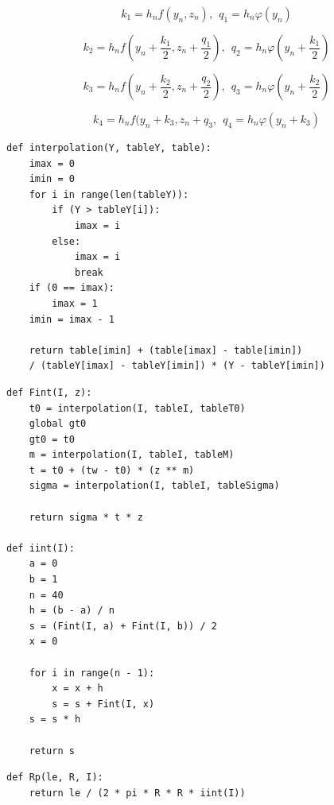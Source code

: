 \documentclass[a4paper,14pt]{extreport} %
\begin{document}
\begin{enumerate}
\begin{equation*}
    k_1 = h_n f(y_n, z_n), ~~q_1 = h_n \varphi (y_n)
\end{equation*}

\begin{equation*}
    k_2 = h_n f (y_n + \frac{k_1}{2}, z_n + \frac{q_1}{2}),~~ q_2 = h_n \varphi(y_n + \frac{k_1}{2})
\end{equation*}

\begin{equation*}
    k_3 = h_n f (y_n + \frac{k_2}{2}, z_n + \frac{q_2}{2}), ~~q_3 = h_n \varphi(y_n + \frac{k_2}{2})
\end{equation*}

\begin{equation*}
    k_4 = h_n f (y_n + k_3, z_n + q_3, ~~q_4 = h_n \varphi(y_n + k_3)
\end{equation*}


\begin{lstlisting}[caption=Интерполяция]
def interpolation(Y, tableY, table):
    imax = 0
    imin = 0
    for i in range(len(tableY)):
        if (Y > tableY[i]):
            imax = i
        else:
            imax = i
            break
    if (0 == imax):
        imax = 1
    imin = imax - 1

    return table[imin] + (table[imax] - table[imin]) 
    / (tableY[imax] - tableY[imin]) * (Y - tableY[imin])
\end{lstlisting}

\begin{lstlisting}[caption=Интегрирование методом трапеций]
def Fint(I, z):
    t0 = interpolation(I, tableI, tableT0)
    global gt0
    gt0 = t0
    m = interpolation(I, tableI, tableM)
    t = t0 + (tw - t0) * (z ** m)
    sigma = interpolation(I, tableI, tableSigma)

    return sigma * t * z

def iint(I):
    a = 0
    b = 1
    n = 40
    h = (b - a) / n
    s = (Fint(I, a) + Fint(I, b)) / 2
    x = 0

    for i in range(n - 1):
        x = x + h
        s = s + Fint(I, x)
    s = s * h

    return s
\end{lstlisting}

\begin{lstlisting}[caption=Нахождение сопротивления газоразрядной трубки]
def Rp(le, R, I):
    return le / (2 * pi * R * R * iint(I))
\end{lstlisting}


\end{enumerate}
\end{document}
